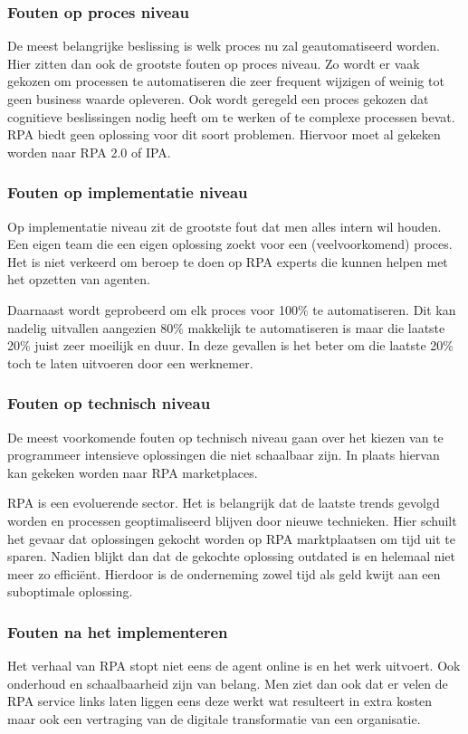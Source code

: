 \subsubsection{Fouten op proces niveau}
De meest belangrijke beslissing is welk proces nu zal geautomatiseerd worden. Hier zitten dan ook de grootste fouten op proces niveau. Zo wordt er vaak gekozen om processen te automatiseren die zeer frequent wijzigen of weinig tot geen business waarde opleveren. Ook wordt geregeld een proces gekozen dat cognitieve beslissingen nodig heeft om te werken of te complexe processen bevat. RPA biedt geen oplossing voor dit soort problemen. Hiervoor moet al gekeken worden naar RPA 2.0 of IPA. \autocite{pitfallsRPA}

\subsubsection{Fouten op implementatie niveau}
Op implementatie niveau zit de grootste fout dat men alles intern wil houden. Een eigen team die een eigen oplossing zoekt voor een (veelvoorkomend) proces. Het is niet verkeerd om beroep te doen op RPA experts die kunnen helpen met het opzetten van agenten. \autocite{pitfallsRPA}

Daarnaast wordt geprobeerd om elk proces voor 100\% te automatiseren. Dit kan nadelig uitvallen aangezien 80\% makkelijk te automatiseren is maar die laatste 20\% juist zeer moeilijk en duur. In deze gevallen is het beter om die laatste 20\% toch te laten uitvoeren door een werknemer. \autocite{pitfallsRPA}

\subsubsection{Fouten op technisch niveau}
De meest voorkomende fouten op technisch niveau gaan over het kiezen van te programmeer intensieve oplossingen die niet schaalbaar zijn. In plaats hiervan kan gekeken worden naar RPA marketplaces. \autocite{pitfallsRPA}

RPA is een evoluerende sector. Het is belangrijk dat de laatste trends gevolgd worden en processen geoptimaliseerd blijven door nieuwe technieken. Hier schuilt het gevaar dat oplossingen gekocht worden op RPA marktplaatsen om tijd uit te sparen. Nadien blijkt dan dat de gekochte oplossing outdated is en helemaal niet meer zo efficiënt. Hierdoor is de onderneming zowel tijd als geld kwijt aan een suboptimale oplossing. \autocite{pitfallsRPA}

\subsubsection{Fouten na het implementeren}
Het verhaal van RPA stopt niet eens de agent online is en het werk uitvoert. Ook onderhoud en schaalbaarheid zijn van belang. Men ziet dan ook dat er velen de RPA service links laten liggen eens deze werkt wat resulteert in extra kosten maar ook een vertraging van de digitale transformatie van een organisatie. \autocite{pitfallsRPA}

